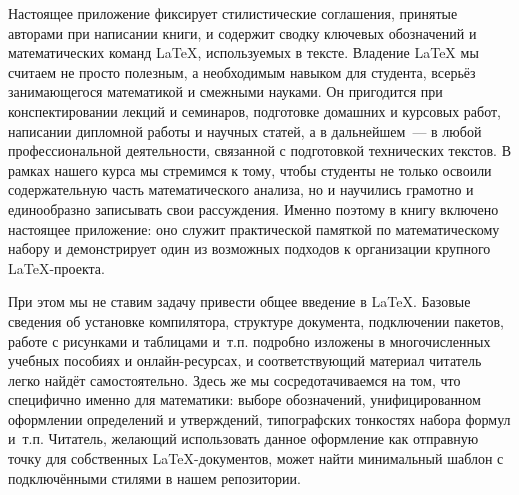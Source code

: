 Настоящее приложение фиксирует стилистические соглашения, принятые авторами при написании книги, и содержит сводку ключевых обозначений и математических команд LaTeX, используемых в тексте.
Владение LaTeX мы считаем не просто полезным, а необходимым навыком для студента, всерьёз занимающегося математикой и смежными науками.
Он пригодится при конспектировании лекций и семинаров, подготовке домашних и курсовых работ, написании дипломной работы и научных статей, а в дальнейшем~--- в любой профессиональной деятельности, связанной с подготовкой технических текстов.
В рамках нашего курса мы стремимся к тому, чтобы студенты не только освоили содержательную часть математического анализа, но и научились грамотно и единообразно записывать свои рассуждения.
Именно поэтому в книгу включено настоящее приложение: оно служит практической памяткой по математическому набору и демонстрирует один из возможных подходов к организации крупного LaTeX-проекта.

При этом мы не ставим задачу привести общее введение в LaTeX.
Базовые сведения об установке компилятора, структуре документа, подключении пакетов, работе с рисунками и таблицами и~т.п. подробно изложены в многочисленных учебных пособиях и онлайн-ресурсах, и соответствующий материал читатель легко найдёт самостоятельно.
Здесь же мы сосредотачиваемся на том, что специфично именно для математики: выборе обозначений, унифицированном оформлении определений и утверждений, типографских тонкостях набора формул и~т.п.
Читатель, желающий использовать данное оформление как отправную точку для собственных LaTeX-документов, может найти минимальный шаблон с подключёнными стилями в нашем репозитории.


